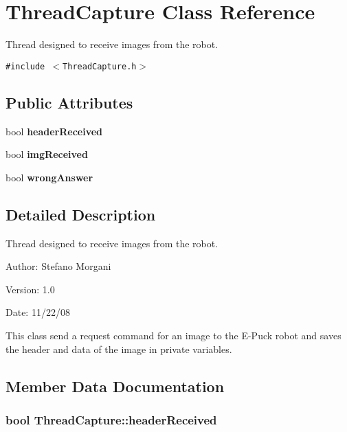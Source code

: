 \section{ThreadCapture Class Reference}
\label{class_thread_capture}
Thread designed to receive images from the robot.  


{\tt \#include $<$ThreadCapture.h$>$}

\subsection*{Public Attributes}
\begin{CompactItemize}
\item 
bool {\bf headerReceived}
\item 
bool {\bf imgReceived}
\item 
bool {\bf wrongAnswer}
\end{CompactItemize}


\subsection{Detailed Description}
Thread designed to receive images from the robot. 

\begin{Desc}
\item[Author:]Stefano Morgani \end{Desc}
\begin{Desc}
\item[Version:]1.0 \end{Desc}
\begin{Desc}
\item[Date:]11/22/08\end{Desc}
This class send a request command for an image to the E-Puck robot and saves the header and data of the image in private variables. 

\subsection{Member Data Documentation}
\subsubsection[headerReceived]{\setlength{\rightskip}{0pt plus 5cm}bool {\bf ThreadCapture::headerReceived}}\label{class_thread_capture_1c7374d43d4fe098f9dd5cd19b0327e1}


